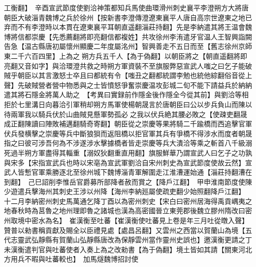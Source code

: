工衡翻】　辛酉宣武節度使劉洽神策都知兵馬使曲環滑州刺史襄平李澄朔方大將唐朝臣大破淄青魏博之兵於徐州【按新書李澄傳澄遼東襄平人唐自高宗世遼東之地已弃而不有李澄時以本貫在遼東襄平耳朝直遥翻淄莊持翻】先是李納遣其將王温會魏博將信都崇慶【先悉薦翻將即亮翻信都複姓】共攻徐州李洧遣牙官温人王智興詣闕告急【温古縣唐初屬懷州顯慶二年度屬洺州】智興善走不五日而至【舊志徐州京師東二千六百四里】上為之朔方兵五千人【為于偽翻】以朝臣將之【朝直遥翻將即亮翻又音如字】與洽環澄共救之時朔方軍資裝不至旗服弊惡宣武人嗤之曰乞子能破賊乎朝臣以其言激怒士卒且曰都統有令【嗤丑之翻都統謂李勉也統他綜翻俗音從上聲】先破賊營者營中物悉與之士皆憤怒爭奮崇慶温攻彭城二旬不能下請益兵於納納遣其將石隱金將萬人助之　【考異曰實録前作隱金後作隱全今從其前】與劉洽等相拒於七里溝日向暮洽引軍稍却朔方馬軍使楊朝晟言於唐朝臣曰公以步兵負山而陳以待兩軍我以騎兵伏於山曲賊見懸軍勢孤必之我以伏兵絶其腰必敗之【使疎吏翻晟成正翻陳讀曰陣敗補邁翻騎奇寄翻】朝臣從之崇慶等果將騎二千踰橋而西追擊官軍伏兵發横擊之崇慶等兵中斷狼狽而返阻橋以拒官軍其兵有爭橋不得涉水而度者朝晟指之曰彼可涉吾何為不涉遂涉水擊據橋者皆走崇慶等兵大潰洽等乘之斬首八千級溺死過半朔方軍盡得其輜重【溺奴狄翻重直用翻】旗服鮮華乃謂宣武人曰乞子之功孰與宋多【宋指宣武兵也時以宋亳為宣武軍劉洽自宋州刺史為宣武節度使故云然】宣武人皆慙官軍乘勝逐北至徐州城下魏博淄青軍解圍走江淮漕運始通【淄莊持翻漕在到翻】　己巳詔削李惟岳官爵募所部降者赦而賞之【降戶江翻】　甲申淮南節度使陳少遊遣兵擊海州其刺史王涉以州降【海州李納廵屬使疏吏翻少始照翻降戶江翻】　十二月李納密州刺史馬萬通乞降丁酉以為密州刺史【宋白曰密州居海得禹貢嵎夷之地春秋時為莒魯之地州理即魯之諸城也漢為高密國晉立東莞郡後魏立膠州隋改曰密州取境中密水為名】　崔漢衡至吐蕃【崔漢衡使吐蕃見上卷是年三月吐從暾入聲】贊普以勑書稱貢獻及賜全以臣禮見處【處昌呂翻】又雲州之西當以賀蘭山為境【五代志靈武弘靜縣有賀蘭山弘靜縣唐改為保靜雲州當作靈州史誤也】邀漢衡更請之丁未漢衡遣判官與吐蕃使者入奏上為之改勑書【為于偽翻】境土皆如其請【關東河北方用兵不暇與吐蕃較也】　加馬燧魏博招討使


